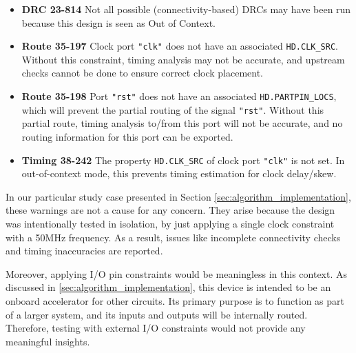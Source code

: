 \begin{tcolorbox}[colback=yellow!20, colframe=yellow!50!black, title=Warnings]
\begin{itemize}
    \item \textbf{DRC 23-814} Not all possible (connectivity-based) DRCs may have been run because this design is seen as Out of Context.
    \item \textbf{Route 35-197} Clock port \texttt{"clk"} does not have an associated \texttt{HD.CLK\_SRC}. Without this constraint, timing analysis may not be accurate, and upstream checks cannot be done to ensure correct clock placement.
    \item \textbf{Route 35-198} Port \texttt{"rst"} does not have an associated \texttt{HD.PARTPIN\_LOCS}, which will prevent the partial routing of the signal \texttt{"rst"}. Without this partial route, timing analysis to/from this port will not be accurate, and no routing information for this port can be exported.
    \item \textbf{Timing 38-242} The property \texttt{HD.CLK\_SRC} of clock port \texttt{"clk"} is not set. In out-of-context mode, this prevents timing estimation for clock delay/skew.
\end{itemize}
\end{tcolorbox}

In our particular study case presented in Section \ref{sec:algorithm_implementation}, these warnings are not a cause for any concern. They arise because the design was intentionally tested in isolation, by just applying a single clock constraint with a 50MHz frequency. As a result, issues like incomplete connectivity checks and timing inaccuracies are reported.

Moreover, applying I/O pin constraints would be meaningless in this context. As discussed in \ref{sec:algorithm_implementation}, this device is intended to be an onboard accelerator for other circuits. Its primary purpose is to function as part of a larger system, and its inputs and outputs will be internally routed. Therefore, testing with external I/O constraints would not provide any meaningful insights.
